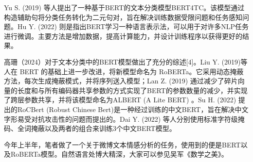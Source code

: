 Yu S. (2019) 等人提出了一种基于BERT的文本分类模型BERT4TC。该模型通过构造辅助句将分类任务转化为二元句对，旨在解决训练数据受限问题和任务感知问题。Hu Y. (2022) 则是指出BERT学习一种语言表示法，可以用于对许多NLP任务进行微调。主要方法是增加数据，提高计算能力，并设计训练程序以获得更好的结果。

高珊（2024）对于文本分类中的BERT模型做出了充分的综述[4]。Liu Y. (2019)等人在 BERT 的基础上进一步改进，将新模型命名为 RoBERTa。它采用动态掩蔽方法，每次生成掩蔽模式，并将序列送入模型；Lan Z. (2019) 通过减少了碎片向量的长度和与所有编码器共享参数的方式实现了BERT的参数数量的减少，并实现了跨层参数共享，并将该模型命名为ALBERT (A Lite BERT) 。Su H. (2022) 提出的RoCBert (Robust Chinese Bert)是一种经过训练的中文BERT，旨在解决中文字形易受对抗攻击性的问题而提出的。Dai Y. (2022) 等人分别使用标准字符级掩码、全词掩蔽以及两者的组合来训练3个中文BERT模型。

今年上半年，笔者做了一个关于微博文本情感分析的任务，使用到的便是BERT以及RoBERTa模型。自然语言处博大精深，大家可以参见吴军《数学之美》。
